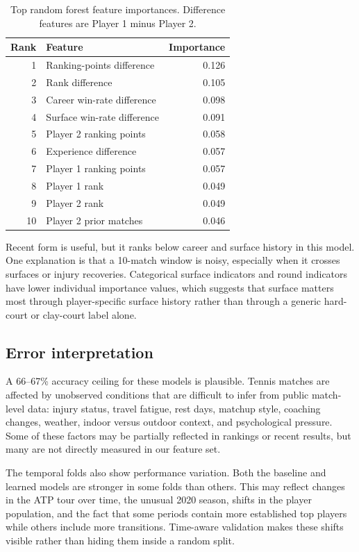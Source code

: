 \documentclass{article}
\begin{document}
\begin{table}[t]
  \caption{Top random forest feature importances. Difference features are Player 1 minus Player 2.}
  \label{tab:feature-importance}
  \centering
  \small
  \begin{tabular}{rlr}
    \toprule
    Rank & Feature & Importance \\
    \midrule
    1 & Ranking-points difference & 0.126 \\
    2 & Rank difference & 0.105 \\
    3 & Career win-rate difference & 0.098 \\
    4 & Surface win-rate difference & 0.091 \\
    5 & Player 2 ranking points & 0.058 \\
    6 & Experience difference & 0.057 \\
    7 & Player 1 ranking points & 0.057 \\
    8 & Player 1 rank & 0.049 \\
    9 & Player 2 rank & 0.049 \\
    10 & Player 2 prior matches & 0.046 \\
    \bottomrule
  \end{tabular}
\end{table}

Recent form is useful, but it ranks below career and surface history in this model. One explanation is that a 10-match window is noisy, especially when it crosses surfaces or injury recoveries. Categorical surface indicators and round indicators have lower individual importance values, which suggests that surface matters most through player-specific surface history rather than through a generic hard-court or clay-court label alone.

\subsection{Error interpretation}

A 66--67\% accuracy ceiling for these models is plausible. Tennis matches are affected by unobserved conditions that are difficult to infer from public match-level data: injury status, travel fatigue, rest days, matchup style, coaching changes, weather, indoor versus outdoor context, and psychological pressure. Some of these factors may be partially reflected in rankings or recent results, but many are not directly measured in our feature set.

The temporal folds also show performance variation. Both the baseline and learned models are stronger in some folds than others. This may reflect changes in the ATP tour over time, the unusual 2020 season, shifts in the player population, and the fact that some periods contain more established top players while others include more transitions. Time-aware validation makes these shifts visible rather than hiding them inside a random split.
\end{document}
